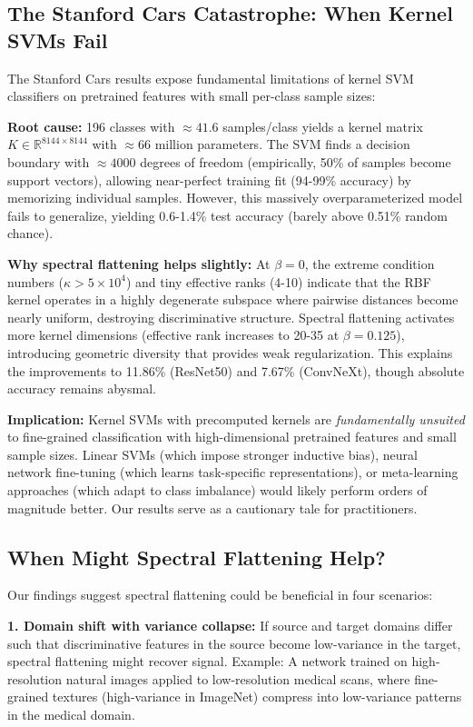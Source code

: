 \documentclass[11pt]{article}
\begin{document}
\subsection{The Stanford Cars Catastrophe: When Kernel SVMs Fail}

The Stanford Cars results expose fundamental limitations of kernel SVM classifiers on pretrained features with small per-class sample sizes:

\textbf{Root cause:} 196 classes with $\approx 41.6$ samples/class yields a kernel matrix $K \in \mathbb{R}^{8144 \times 8144}$ with $\approx 66$ million parameters. The SVM finds a decision boundary with $\approx 4000$ degrees of freedom (empirically, 50\% of samples become support vectors), allowing near-perfect training fit (94-99\% accuracy) by memorizing individual samples. However, this massively overparameterized model fails to generalize, yielding 0.6-1.4\% test accuracy (barely above 0.51\% random chance).

\textbf{Why spectral flattening helps slightly:} At $\beta=0$, the extreme condition numbers ($\kappa > 5 \times 10^4$) and tiny effective ranks (4-10) indicate that the RBF kernel operates in a highly degenerate subspace where pairwise distances become nearly uniform, destroying discriminative structure. Spectral flattening activates more kernel dimensions (effective rank increases to 20-35 at $\beta=0.125$), introducing geometric diversity that provides weak regularization. This explains the improvements to 11.86\% (ResNet50) and 7.67\% (ConvNeXt), though absolute accuracy remains abysmal.

\textbf{Implication:} Kernel SVMs with precomputed kernels are \emph{fundamentally unsuited} to fine-grained classification with high-dimensional pretrained features and small sample sizes. Linear SVMs (which impose stronger inductive bias), neural network fine-tuning (which learns task-specific representations), or meta-learning approaches (which adapt to class imbalance) would likely perform orders of magnitude better. Our results serve as a cautionary tale for practitioners.

\subsection{When Might Spectral Flattening Help?}

Our findings suggest spectral flattening could be beneficial in four scenarios:

\textbf{1. Domain shift with variance collapse:} If source and target domains differ such that discriminative features in the source become low-variance in the target, spectral flattening might recover signal. Example: A network trained on high-resolution natural images applied to low-resolution medical scans, where fine-grained textures (high-variance in ImageNet) compress into low-variance patterns in the medical domain.
\end{document}

